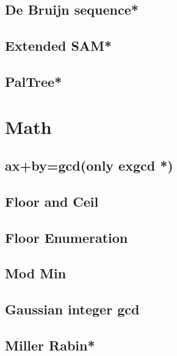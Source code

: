 \subsection{De Bruijn sequence*} %

\subsection{Extended SAM*} %

\subsection{PalTree*} %



\section{Math}
\subsection{ax+by=gcd(only exgcd *)} %

\subsection{Floor and Ceil}

\subsection{Floor Enumeration}

\subsection{Mod Min}

\subsection{Gaussian integer gcd}

% 
\subsection{Miller Rabin*} %

% 
%
